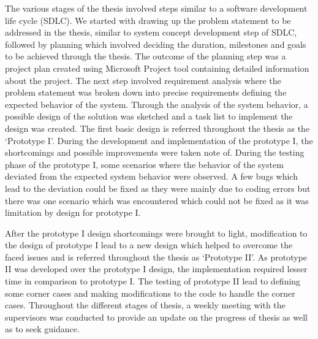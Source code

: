 The various stages of the thesis involved steps similar to a software development life cycle (SDLC). We started with drawing up the problem statement to be addressed in the thesis, similar to system concept development step of SDLC, followed by planning which involved deciding the duration, milestones and goals to be achieved through the thesis. The outcome of the planning step was a project plan created using Microsoft Project tool containing detailed information about the project. The next step involved requirement analysis where the problem statement was broken down into precise requirements defining the expected behavior of the system. Through the analysis of the system behavior, a possible design of the solution was sketched and a task list to implement the design was created. The first basic design is referred throughout the thesis as the {\lq}Prototype I{\rq}. During the development and implementation of the prototype I, the shortcomings and possible improvements were taken note of. During the testing phase of the prototype I, some scenarios where the behavior of the system deviated from the expected system behavior were observed. A few bugs which lead to the deviation could be fixed as they were mainly due to coding errors but there was one scenario which was encountered which could not be fixed as it was limitation by design for prototype I. \newline

After the prototype I design shortcomings were brought to light, modification to the design of prototype I lead to a new design which helped to overcome the faced issues and is referred throughout the thesis as {\lq}Prototype II{\rq}. As prototype II was developed over the prototype I design, the implementation required lesser time in comparison to prototype I. The testing of prototype II lead to defining some corner cases and making modifications to the code to handle the corner cases. Throughout the different stages of thesis, a weekly meeting with the supervisors was conducted to provide an update on the progress of thesis as well as to seek guidance.


